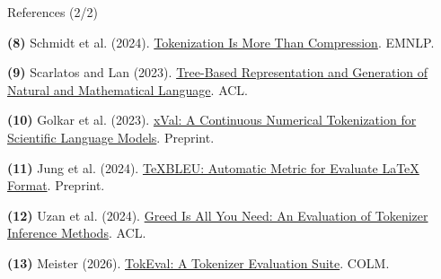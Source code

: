 \documentclass[11pt,aspectratio=43]{beamer}
\newcommand{\major}[1]{\renewcommand{\currentmajor}{#1}}
\begin{document}
\major{References}
\begin{frame}[t]{References (2/2)}
\relax
{\scriptsize \par\noindent\hypertarget{ref-pathpiece}{}\textbf{(8)} Schmidt et al. (2024). \href{https://aclanthology.org/2024.emnlp-main.40/}{Tokenization Is More Than Compression}. EMNLP.\par\vspace{14pt}
\par\noindent\hypertarget{ref-mathgpt}{}\textbf{(9)} Scarlatos and Lan (2023). \href{https://aclanthology.org/2023.acl-long.205/}{Tree-Based Representation and Generation of Natural and Mathematical Language}. ACL.\par\vspace{14pt}
\par\noindent\hypertarget{ref-xval}{}\textbf{(10)} Golkar et al. (2023). \href{https://arxiv.org/abs/2310.02989}{xVal: A Continuous Numerical Tokenization for Scientific Language Models}. Preprint.\par\vspace{14pt}
\par\noindent\hypertarget{ref-texbleu}{}\textbf{(11)} Jung et al. (2024). \href{https://arxiv.org/abs/2409.06639}{TeXBLEU: Automatic Metric for Evaluate LaTeX Format}. Preprint.\par\vspace{14pt}
\par\noindent\hypertarget{ref-greed}{}\textbf{(12)} Uzan et al. (2024). \href{https://aclanthology.org/2024.acl-short.73/}{Greed Is All You Need: An Evaluation of Tokenizer Inference Methods}. ACL.\par\vspace{14pt}
\par\noindent\hypertarget{ref-tokeval}{}\textbf{(13)} Meister (2026). \href{https://arxiv.org/abs/2608.18062}{TokEval: A Tokenizer Evaluation Suite}. COLM.\par\vspace{14pt}}
\end{frame}
\end{document}
